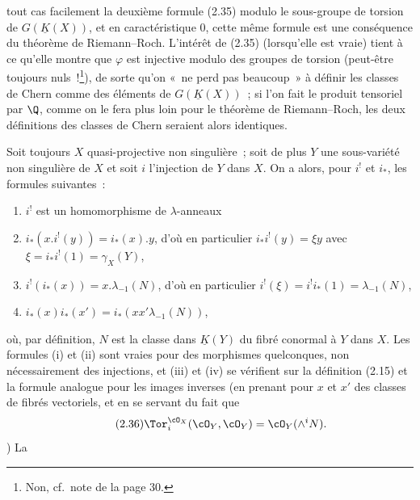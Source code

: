 tout cas facilement la deuxième formule (2.35) modulo le sous-groupe de torsion de $G(\underline K(X))$, et en caractéristique $0$, cette même formule est une conséquence du théorème de Riemann--Roch. L'intérêt de (2.35) (lorsqu'elle est vraie) tient à ce qu'elle montre que $\varphi$ est injective modulo des groupes de torsion (peut-être toujours nuls~!\footnote{Non, cf.\ note de la page 30.}), de sorte qu'on «~ne perd pas beaucoup~» à définir les classes de Chern comme des éléments de $G(\underline K(X))$~; si l'on fait le produit tensoriel par $\Q$, comme on le fera plus loin pour le théorème de Riemann--Roch, les deux définitions des classes de Chern seraient alors identiques.

Soit toujours $X$ quasi-projective non singulière~; soit de plus $Y$ une sous-variété non singulière de $X$ et soit $i$ l'injection de $Y$ dans $X$. On a alors, pour $i^!$ et $i_*$, les formules suivantes~:
\begin{enumerate}[label=(\roman*)]
\item $i^!$ est un homomorphisme de $\lambda$-anneaux
\item $i_*(x.i^!(y))=i_*(x).y$, d'où en particulier $i_*i^!(y)=\xi y$ avec $\xi=i_*i^!(1)=\gamma_X(Y)$,
\item $i^!(i_*(x))=x.\lambda_{-1}(N)$, d'où en particulier $i^!(\xi)=i^!i_*(1)=\lambda_{-1}(N)$,
\item $i_*(x)i_*(x')=i_*(xx'\lambda_{-1}(N))$,
\end{enumerate}
où, par définition, $N$ est la classe dans $\underline K(Y)$ du fibré conormal à $Y$ dans $X$. Les formules (i) et (ii) sont vraies pour des morphismes quelconques, non nécessairement des injections, et (iii) et (iv) se vérifient sur la définition (2.15) et la formule analogue pour les images inverses (en prenant pour $x$ et $x'$ des classes de fibrés vectoriels, et en se servant du fait que
\begin{equation}\tag{2.36}
 \Tor^{\cO_X}_i(\cO_Y,\cO_Y)=\cO_Y(\wedge^i N).
\end{equation}
)
La
